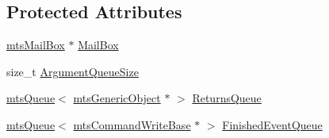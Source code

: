 \subsection*{Protected Attributes}
\begin{DoxyCompactItemize}
\item 
\hyperlink{classmts_mail_box}{mts\-Mail\-Box} $\ast$ \hyperlink{classmts_command_queued_void_return_base_a5e0f1804f0fe7a3aa22cf92eb013cc54}{Mail\-Box}
\item 
size\-\_\-t \hyperlink{classmts_command_queued_void_return_base_a3afbf01037322b73778768074d95c9c7}{Argument\-Queue\-Size}
\item 
\hyperlink{classmts_queue}{mts\-Queue}$<$ \hyperlink{classmts_generic_object}{mts\-Generic\-Object} $\ast$ $>$ \hyperlink{classmts_command_queued_void_return_base_a9926c9d6613de0a461be38fcb5739be5}{Returns\-Queue}
\item 
\hyperlink{classmts_queue}{mts\-Queue}$<$ \hyperlink{classmts_command_write_base}{mts\-Command\-Write\-Base} $\ast$ $>$ \hyperlink{classmts_command_queued_void_return_base_a465d5cf2576bc4c931ee7f436846051e}{Finished\-Event\-Queue}
\end{DoxyCompactItemize}


